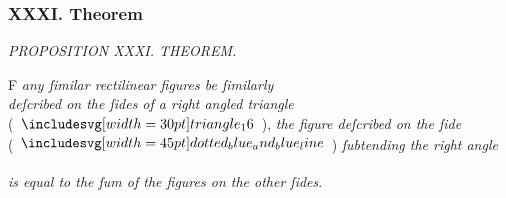 \documentclass[12pt,preview]{standalone}
\begin{document}
\subsubsection{XXXI. Theorem}

\begin{minipage}[t]{0.64\textwidth}
    \vspace{0pt}

    \begin{center}
        \textit{PROPOSITION XXXI. THEOREM.}\label{book6pr31} \\
    \end{center}

    \hfill

    \begin{center}
        \raggedright \lettrine[lines=4, loversize=1, nindent=0pt]{}{}F \textit{any ſimilar rectilinear figures be ſimilarly\\ deſcribed on the ſides of a right angled triangle}\\ (\hspace{-1ex}$\img[0][0][30]{triangle_16}$\hspace{-1ex}), \textit{the figure deſcribed on the ſide}\\ (\hspace{-1ex}$\bimg{dotted_blue_and_blue_line}$\hspace{-1ex}) \textit{ſubtending the right angle}
    \end{center}
    \textit{is equal to the ſum of the figures on the other ſides}.

    \hfill

    \hfill


\end{minipage}
\end{document}
